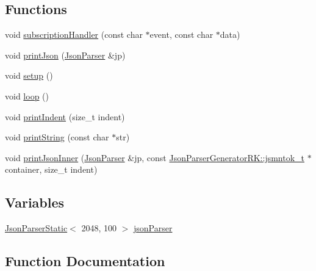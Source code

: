 \subsection*{Functions}
\begin{DoxyCompactItemize}
\item 
void \hyperlink{3-subscription-_json_parser_generator_r_k_8cpp_aa0bcca6652c4f60cb6e9bd893484650b}{subscription\+Handler} (const char $\ast$event, const char $\ast$data)
\item 
void \hyperlink{3-subscription-_json_parser_generator_r_k_8cpp_aa852eb9203676959147483523ec49997}{print\+Json} (\hyperlink{class_json_parser}{Json\+Parser} \&jp)
\item 
void \hyperlink{3-subscription-_json_parser_generator_r_k_8cpp_a4fc01d736fe50cf5b977f755b675f11d}{setup} ()
\item 
void \hyperlink{3-subscription-_json_parser_generator_r_k_8cpp_afe461d27b9c48d5921c00d521181f12f}{loop} ()
\item 
void \hyperlink{3-subscription-_json_parser_generator_r_k_8cpp_ae269cd10672ea800dd6fd6f14e48d0f8}{print\+Indent} (size\+\_\+t indent)
\item 
void \hyperlink{3-subscription-_json_parser_generator_r_k_8cpp_abe6d5621640c26d89a09be56928cd923}{print\+String} (const char $\ast$str)
\item 
void \hyperlink{3-subscription-_json_parser_generator_r_k_8cpp_a7a86f133587ae90abe048be568db828f}{print\+Json\+Inner} (\hyperlink{class_json_parser}{Json\+Parser} \&jp, const \hyperlink{struct_json_parser_generator_r_k_1_1jsmntok__t}{Json\+Parser\+Generator\+R\+K\+::jsmntok\+\_\+t} $\ast$container, size\+\_\+t indent)
\end{DoxyCompactItemize}
\subsection*{Variables}
\begin{DoxyCompactItemize}
\item 
\hyperlink{class_json_parser_static}{Json\+Parser\+Static}$<$ 2048, 100 $>$ \hyperlink{3-subscription-_json_parser_generator_r_k_8cpp_af1c065455ff8e2f533af5dd925c8469d}{json\+Parser}
\end{DoxyCompactItemize}


\subsection{Function Documentation}
\mbox{\label{3-subscription-_json_parser_generator_r_k_8cpp_afe461d27b9c48d5921c00d521181f12f}} 
